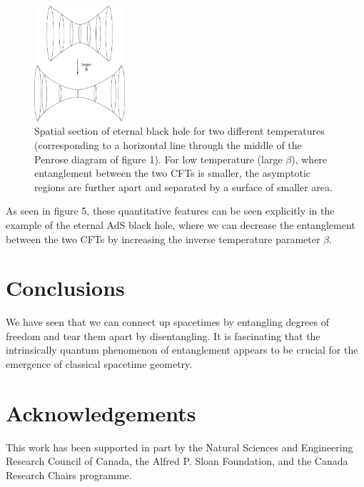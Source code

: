 \documentclass[12pt,epsf]{article}
\renewcommand{\(}{\left(}
\renewcommand{\)}{\right)}
\begin{document}
\begin{figure}
\centering
\includegraphics[width=0.3\textwidth]{throats.eps}
\caption{Spatial section of eternal black hole for two different temperatures (corresponding to a horizontal line through the middle of the Penrose diagram of figure 1). For low temperature (large $\beta$), where entanglement between the two CFTs is smaller, the asymptotic regions are further apart and separated by a surface of smaller area.}
\end{figure}
As seen in figure 5, these quantitative features can be seen explicitly in the example of the eternal AdS black hole, where we can decrease the entanglement between the two CFTs by increasing the inverse temperature parameter $\beta$.

\section{Conclusions}

We have seen that we can connect up spacetimes by entangling degrees of freedom and tear them apart by disentangling. It is fascinating that the intrinsically quantum phenomenon of entanglement appears to be crucial for the emergence of classical spacetime geometry.

\section{Acknowledgements}
This work has been supported in part by the Natural Sciences and Engineering Research Council of Canada, the Alfred P. Sloan Foundation, and the Canada Research Chairs programme.
\end{document}
